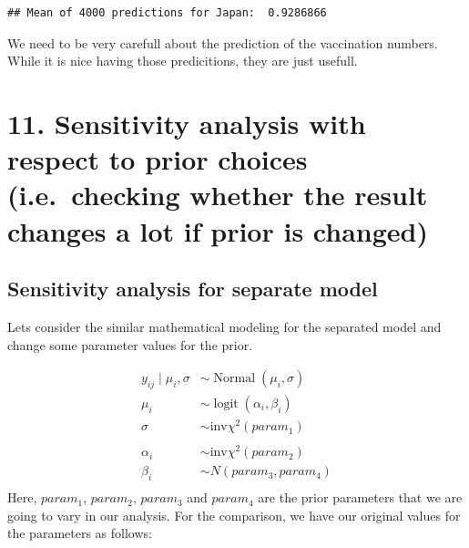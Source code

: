 \documentclass[
]{article}
\newenvironment{Shaded}{\begin{snugshade}}{\end{snugshade}}
\newcommand{\DecValTok}[1]{\textcolor[rgb]{0.00,0.00,0.81}{#1}}
\newcommand{\FunctionTok}[1]{\textcolor[rgb]{0.00,0.00,0.00}{#1}}
\newcommand{\NormalTok}[1]{#1}
\newcommand{\SpecialCharTok}[1]{\textcolor[rgb]{0.00,0.00,0.00}{#1}}
\newcommand{\StringTok}[1]{\textcolor[rgb]{0.31,0.60,0.02}{#1}}
\begin{document}
\begin{Shaded}
\end{Shaded}

\begin{verbatim}
## Mean of 4000 predictions for Japan:  0.9286866
\end{verbatim}

We need to be very carefull about the prediction of the vaccination
numbers. While it is nice having those predicitions, they are just
usefull.

\newpage

\hypertarget{sensitivity-analysis-with-respect-to-prior-choices-i.e.-checking-whether-the-result-changes-a-lot-if-prior-is-changed}{%
\section{11. Sensitivity analysis with respect to prior choices
(i.e.~checking whether the result changes a lot if prior is
changed)}\label{sensitivity-analysis-with-respect-to-prior-choices-i.e.-checking-whether-the-result-changes-a-lot-if-prior-is-changed}}

\hypertarget{sensitivity-analysis-for-separate-model}{%
\subsection{Sensitivity analysis for separate
model}\label{sensitivity-analysis-for-separate-model}}

Lets consider the similar mathematical modeling for the separated model
and change some parameter values for the prior.

\[
  \begin{aligned}
y_{i j} \mid \mu_i, \sigma &\sim \operatorname{Normal}\left(\mu_i, \sigma\right) \\
\mu_i &\sim \operatorname{logit}(\alpha_i, \beta_i)\\
\sigma &\sim \text{inv}\chi^2(param_1)\\
\\
\alpha_i &\sim \text{inv}\chi^2(param_2) \\
\beta_i &\sim N(param_3, param_4) \\
\end{aligned}
\] Here, \(param_1\), \(param_2\), \(param_3\) and \(param_4\) are the
prior parameters that we are going to vary in our analysis. For the
comparison, we have our original values for the parameters as follows:
\end{document}
